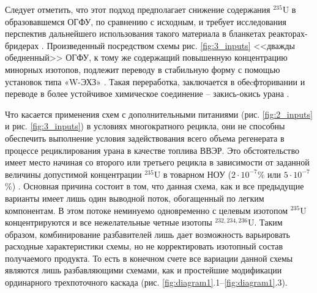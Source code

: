 Следует отметить, что этот подход предполагает снижение содержания $^{235}$U в образовавшемся ОГФУ, по сравнению с исходным, и требует исследования перспектив дальнейшего использования такого материала в бланкетах реакторах-бридерах \cite{smirnovApplyingEnrichmentCapacities2018}.
Произведенный посредством схемы рис. \ref{fig:3_inputs} <<дважды обедненный>> ОГФУ, к тому же содержащий повышенную концентрацию минорных изотопов, подлежит переводу в стабильную форму с помощью установок типа «W-ЭХЗ» \cite{RosatomGoskorporaciyaRosatoma}. Такая переработка, заключается в обеcфторивании и переводе в более устойчивое химическое соединение -- закись-окись урана  \cite{PererabotkaOGFUObrazovaniem2014}.

Что касается применения схем с дополнительными питаниями (рис. \ref{fig:2_inputs} и рис. \ref{fig:3_inputs}) в условиях многократного рецикла, они не способны обеспечить выполнение условия задействования всего объема регенерата в процессе рециклирования урана в качестве топлива ВВЭР. Это обстоятельство имеет место начиная со второго или третьего рецикла в зависимости от заданной величины допустимой концентрации $^{235}$U в товарном НОУ ($2\cdot10^{-7}$\% или $5\cdot10^{-7}$\%) \cite{smirnovEvolutionIsotopicComposition2012}. Основная причина состоит в том, что данная схема, как и все предыдущие варианты имеет лишь один выводной поток, обогащенный по легким компонентам. В этом потоке неминуемо одновременно с целевым изотопом  $^{235}$U концентрируются и все нежелательные четные изотопы $^{232,234,236}$U. Таким образом, комбинирование разбавителей лишь дает возможность варьировать расходные характеристики схемы, но не корректировать изотопный состав получаемого продукта. То есть в конечном счете все вариации данной схемы являются лишь разбавляющими схемами, как и простейшие модификации ординарного трехпоточного каскада (рис. \ref{fig:diagram1}.1--\ref{fig:diagram1}.3).



